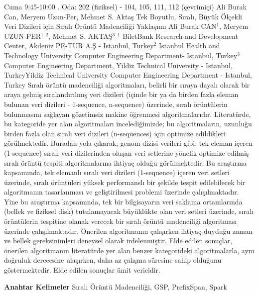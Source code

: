 
    \begin{abstract_basarim}
    {Cuma 9:45-10:00}
    {.}
    {Oda: 202 (fiziksel) - 104, 105, 111, 112 (çevrimiçi)}
    {Ali Burak Can, Meryem Uzun-Per, Mehmet S. Aktaş}
    {Tek Boyutlu, Sıralı, Büyük Ölçekli Veri Dizileri için Sıralı Örüntü Madenciliği Yaklaşımı}
    {%
    Ali Burak CAN$^{1}$, Meryem UZUN-PER$^{1,2}$, Mehmet S. AKTAŞ$^{3}$}
    {%
    }
    {%
    $^1$ BiletBank Research and Development Center, Akdeniz PE-TUR A.Ş - Istanbul, Turkey\newline{}$^2$ Istanbul Health and Technology University Computer Engineering Department- Istanbul, Turkey\newline{}$^3$ Computer Engineering Department, Yildiz Technical University - Istanbul, TurkeyYildiz Technical University Computer Engineering Department - Istanbul, Turkey}
    Sıralı örüntü madenciliği algoritmaları, belirli bir sıraya dayalı olarak bir araya gelmiş sıralandırılmış veri dizileri (içinde bir ya da birden fazla eleman bulunan veri dizileri - 1-sequence, n-sequence) üzerinde, sıralı örüntülerin bulunmasını sağlayan gözetimsiz makine öğrenmesi algoritmalarıdır. Literatürde, bu kategoride yer alan algoritmaları incelediğimizde; bu algoritmaların, uzunluğu birden fazla olan sıralı veri dizileri (n-sequences) için optimize edildikleri görülmektedir. Buradan yola çıkarak, genom dizisi verileri gibi, tek eleman içeren (1-sequence) sıralı veri dizilerinden oluşan veri setlerine yönelik optimize edilmiş sıralı örüntü tespiti algoritmalarına ihtiyaç olduğu görülmektedir. Bu araştırma kapsamında, tek elemanlı sıralı veri dizileri (1-sequence) içeren veri setleri üzerinde, sıralı örüntüleri yüksek performanslı bir şekilde tespit edilebilecek bir algoritmanın tasarlanması ve geliştirilmesi problemi üzerinde çalışılmaktadır. Yine bu araştırma kapsamında, tek bir bilgisayarın veri saklama ortamlarında (bellek ve fiziksel disk) tutulamayacak büyüklükte olan veri setleri üzerinde, sıralı örüntülerin tespitine olanak verecek bir sıralı örüntü madenciliği algoritması üzerinde çalışılmaktadır. Önerilen algoritmanın çalışırken ihtiyaç duyduğu zaman ve bellek gereksinimleri deneysel olarak irdelenmiştir. Elde edilen sonuçlar, önerilen algoritmanın literatürde yer alan benzer kategorideki algoritmalarla, aynı doğruluk derecesine ulaşırken, daha az çalışma süresine sahip olduğunu göstermektedir. Elde edilen sonuçlar ümit vericidir. 
    
            \textbf{Anahtar Kelimeler} \newline{}Sıralı Örüntü Madenciliği, GSP, PrefixSpan, Spark
    \end{abstract_basarim}
    